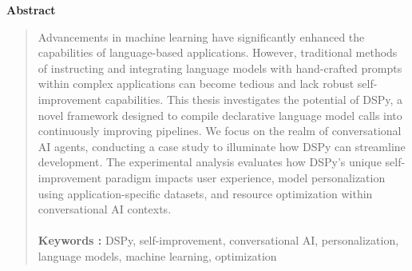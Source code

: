 \newenvironment{abstracts} {\begin{alwayssingle} \pagestyle{empty}
  \begin{center}
  \vspace*{1.5cm}
  {\Large \bfseries  Abstract}
  \end{center}
  \vspace{0.5cm} \begin{quote}}
{\end{quote}\end{alwayssingle}}
\begin{abstracts}

 Advancements in machine learning have significantly enhanced the capabilities of language-based applications. However, traditional methods of instructing and integrating language models with hand-crafted prompts within complex applications can become tedious and lack robust self-improvement capabilities.  This thesis investigates the potential of DSPy, a novel framework designed to compile declarative language model calls into continuously improving pipelines. We focus on the realm of conversational AI agents, conducting a case study to illuminate how DSPy can streamline development. The experimental analysis evaluates how DSPy's unique self-improvement paradigm impacts user experience, model personalization using application-specific datasets, and resource optimization within conversational AI contexts.\\ \\
\textbf{Keywords : } {DSPy, self-improvement, conversational AI, personalization, language models, machine learning, optimization}
\end{abstracts}
